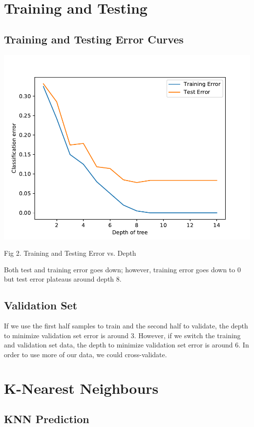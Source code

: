 \documentclass{article}
\begin{document}
\section{Training and Testing}

\subsection{Training and Testing Error Curves}

\includegraphics[scale=0.8]{../figs/q3_1_train_vs_test}
\\ \centerline{Fig 2. Training and Testing Error vs. Depth}

Both test and training error goes down; however, training error goes down to 0 but test error plateaus around depth 8.
 
\subsection{Validation Set}

If we use the first half samples to train and the second half to validate, the depth to minimize validation set error is around 3. However, if we switch the training and validation set data, the depth to minimize validation set error is around 6. In order to use more of our data, we could cross-validate. 

\section{K-Nearest Neighbours}

\subsection{KNN Prediction}
\end{document}
